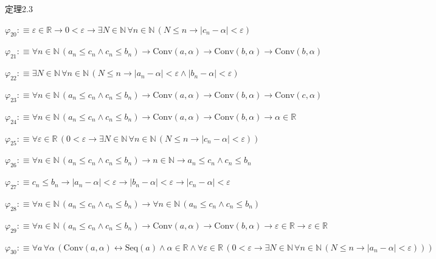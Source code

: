 \begin{fullproof}{定理2.3}
\begin{abbrevlist}
\item $\varphi_{20} :\equiv \varepsilon \in \mathbb{R} \to 0 < \varepsilon \to \exists N \in \mathbb{N}\,\forall n \in \mathbb{N}\,(N \leq n \to \lvert c_{n} - \alpha \rvert < \varepsilon)$
\item $\varphi_{21} :\equiv \forall n \in \mathbb{N}\,(a_{n} \leq c_{n} \land c_{n} \leq b_{n}) \to \mathrm{Conv}(a,\alpha) \to \mathrm{Conv}(b,\alpha) \to \mathrm{Conv}(b,\alpha)$
\item $\varphi_{22} :\equiv \exists N \in \mathbb{N}\,\forall n \in \mathbb{N}\,(N \leq n \to \lvert a_{n} - \alpha \rvert < \varepsilon \land \lvert b_{n} - \alpha \rvert < \varepsilon)$
\item $\varphi_{23} :\equiv \forall n \in \mathbb{N}\,(a_{n} \leq c_{n} \land c_{n} \leq b_{n}) \to \mathrm{Conv}(a,\alpha) \to \mathrm{Conv}(b,\alpha) \to \mathrm{Conv}(c,\alpha)$
\item $\varphi_{24} :\equiv \forall n \in \mathbb{N}\,(a_{n} \leq c_{n} \land c_{n} \leq b_{n}) \to \mathrm{Conv}(a,\alpha) \to \mathrm{Conv}(b,\alpha) \to \alpha \in \mathbb{R}$
\item $\varphi_{25} :\equiv \forall \varepsilon \in \mathbb{R}\,(0 < \varepsilon \to \exists N \in \mathbb{N}\,\forall n \in \mathbb{N}\,(N \leq n \to \lvert c_{n} - \alpha \rvert < \varepsilon))$
\item $\varphi_{26} :\equiv \forall n \in \mathbb{N}\,(a_{n} \leq c_{n} \land c_{n} \leq b_{n}) \to n \in \mathbb{N} \to a_{n} \leq c_{n} \land c_{n} \leq b_{n}$
\item $\varphi_{27} :\equiv c_{n} \leq b_{n} \to \lvert a_{n} - \alpha \rvert < \varepsilon \to \lvert b_{n} - \alpha \rvert < \varepsilon \to \lvert c_{n} - \alpha \rvert < \varepsilon$
\item $\varphi_{28} :\equiv \forall n \in \mathbb{N}\,(a_{n} \leq c_{n} \land c_{n} \leq b_{n}) \to \forall n \in \mathbb{N}\,(a_{n} \leq c_{n} \land c_{n} \leq b_{n})$
\item $\varphi_{29} :\equiv \forall n \in \mathbb{N}\,(a_{n} \leq c_{n} \land c_{n} \leq b_{n}) \to \mathrm{Conv}(a,\alpha) \to \mathrm{Conv}(b,\alpha) \to \varepsilon \in \mathbb{R} \to \varepsilon \in \mathbb{R}$
\item $\varphi_{30} :\equiv \forall a\,\forall \alpha\,(\mathrm{Conv}(a,\alpha) \leftrightarrow \mathrm{Seq}(a) \land \alpha \in \mathbb{R} \land \forall \varepsilon \in \mathbb{R}\,(0 < \varepsilon \to \exists N \in \mathbb{N}\,\forall n \in \mathbb{N}\,(N \leq n \to \lvert a_{n} - \alpha \rvert < \varepsilon)))$

\end{abbrevlist}
\end{fullproof}
